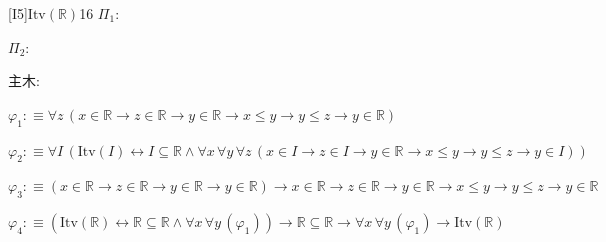 \begin{fullproof}{[I5]}{$\mathrm{Itv}(\mathbb{R})$}{16}\label{tree:ItvReal}
\noindent$\Pi_{1}$:
\begin{ptree}
\end{ptree}
\noindent$\Pi_{2}$:
\begin{ptree}
\noLine
{}
\end{ptree}
\noindent 主木:
\begin{ptree}
\noLine
{}
\end{ptree}
\begin{abbrevlist}
\item $\varphi_{1} :\equiv \forall z\,(x \in \mathbb{R} \to z \in \mathbb{R} \to y \in \mathbb{R} \to x \leq y \to y \leq z \to y \in \mathbb{R})$
\item $\varphi_{2} :\equiv \forall I\,(\mathrm{Itv}(I) \leftrightarrow I \subseteq \mathbb{R} \land \forall x\,\forall y\,\forall z\,(x \in I \to z \in I \to y \in \mathbb{R} \to x \leq y \to y \leq z \to y \in I))$
\item $\varphi_{3} :\equiv (x \in \mathbb{R} \to z \in \mathbb{R} \to y \in \mathbb{R} \to y \in \mathbb{R}) \to x \in \mathbb{R} \to z \in \mathbb{R} \to y \in \mathbb{R} \to x \leq y \to y \leq z \to y \in \mathbb{R}$
\item $\varphi_{4} :\equiv (\mathrm{Itv}(\mathbb{R}) \leftrightarrow \mathbb{R} \subseteq \mathbb{R} \land \forall x\,\forall y\,(\varphi_{1})) \to \mathbb{R} \subseteq \mathbb{R} \to \forall x\,\forall y\,(\varphi_{1}) \to \mathrm{Itv}(\mathbb{R})$
\end{abbrevlist}
\end{fullproof}
